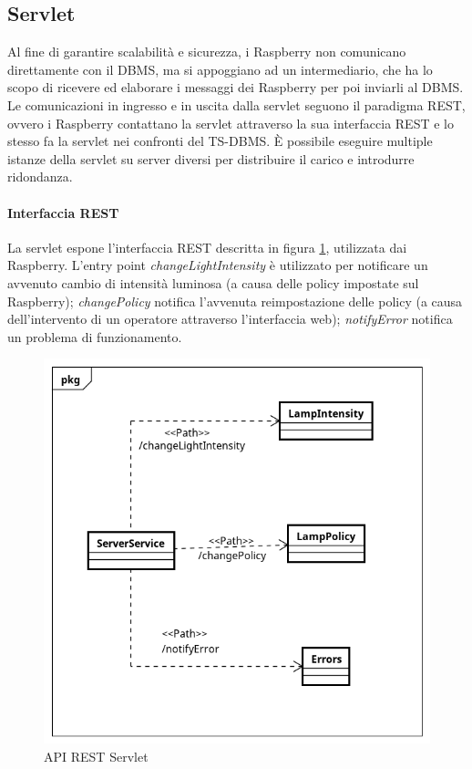 \subsection{Servlet}
Al fine di garantire scalabilità e sicurezza, i Raspberry non comunicano direttamente con il DBMS, ma si appoggiano ad un intermediario, che ha lo scopo di ricevere ed elaborare i messaggi dei Raspberry per poi inviarli al DBMS.
Le comunicazioni in ingresso e in uscita dalla servlet seguono il paradigma REST, ovvero i Raspberry contattano la servlet attraverso la sua interfaccia REST e lo stesso fa la servlet nei confronti del TS-DBMS.
È possibile eseguire multiple istanze della servlet su server diversi per distribuire il carico e introdurre ridondanza.
\paragraph{Interfaccia REST}
La servlet espone l'interfaccia REST descritta in figura \ref{API REST SERVLET}, utilizzata dai Raspberry.
L'entry point \textit{changeLightIntensity} è utilizzato per notificare un avvenuto cambio di intensità luminosa (a causa delle policy impostate sul Raspberry); \textit{changePolicy} notifica l'avvenuta reimpostazione delle policy (a causa dell'intervento di un operatore attraverso l'interfaccia web); \textit{notifyError} notifica un problema di funzionamento.
\begin{figure}[h]
	\centering
	\includegraphics[scale=.8]{figure/Class_Diagram_Server_REST.png}
	\caption{API REST Servlet \label{API REST SERVLET}}
\end{figure}
